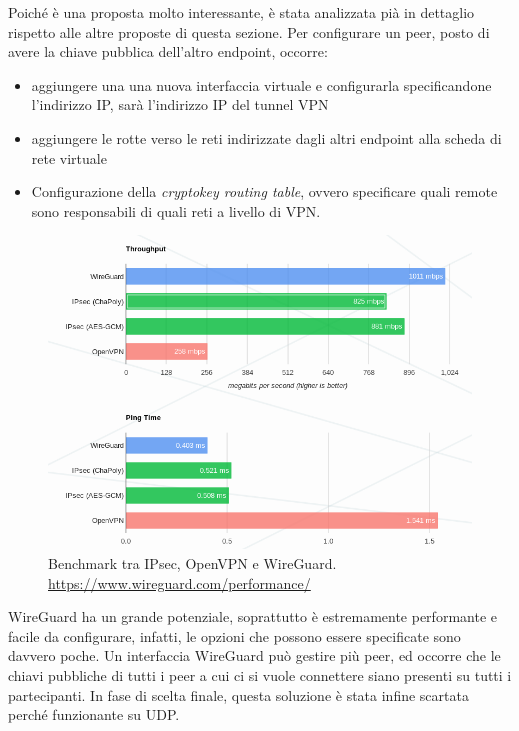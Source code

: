 	      
	      Poiché è una proposta molto interessante, è stata analizzata pià in dettaglio rispetto
	      alle altre proposte di questa sezione. Per configurare un peer,
	      posto di avere la chiave pubblica dell'altro endpoint, occorre:
	      \begin{itemize}
	      	\item aggiungere una una nuova interfaccia virtuale e configurarla specificandone
	      	      l'indirizzo IP, sarà l'indirizzo IP del tunnel VPN
	      	\item aggiungere le rotte verso le reti indirizzate dagli altri endpoint alla scheda
	      	      di rete virtuale
	      	\item Configurazione della \textit{cryptokey routing table}, ovvero specificare
	      	      quali remote sono responsabili di quali reti a livello di VPN\cite{wireguard-quick-start}.
	      \end{itemize}
	      \begin{figure}
	      	\includegraphics[scale=0.45]{img/wireguard_performance}
	      	\caption[Benchmark tra IPsec, OpenVPN e WireGuard]{Benchmark tra IPsec, OpenVPN e WireGuard.
	      		\url{https://www.wireguard.com/performance/}}
	      	\label{fig:wireguard-performance}
	      \end{figure}
	      WireGuard ha un grande potenziale, soprattutto è estremamente performante e facile
	      da configurare, infatti, le opzioni che possono essere specificate sono davvero poche.
	      Un interfaccia WireGuard può gestire più peer, ed occorre che le chiavi pubbliche di tutti
	      i peer a cui ci si vuole connettere siano presenti su tutti i partecipanti. In fase di scelta
	      finale, questa soluzione è stata infine scartata perché funzionante su UDP.
	      
